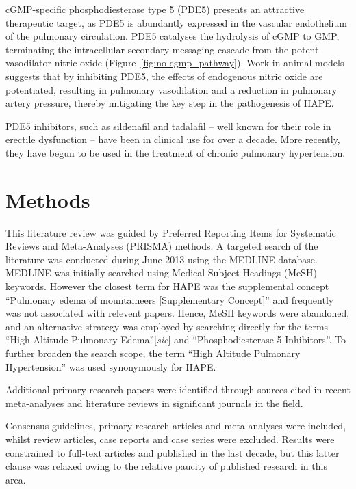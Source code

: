 \documentclass[12pt,a4paper]{article}
\begin{document}
cGMP-specific phosphodiesterase type 5 (PDE5) presents an attractive therapeutic target, as PDE5 is abundantly expressed in the vascular endothelium of the pulmonary circulation.\cite{Ahn:1991vt} PDE5 catalyses the hydrolysis of cGMP to GMP, terminating the intracellular secondary messaging cascade from the potent vasodilator nitric oxide (Figure~\ref{fig:no-cgmp_pathway}).\cite{Archer:2009cx} Work in animal models suggests that by inhibiting PDE5, the effects of endogenous nitric oxide are potentiated, resulting in pulmonary vasodilation and a reduction in pulmonary artery pressure, thereby mitigating the key step in the pathogenesis of HAPE.\cite{Zhao:2001kj}

PDE5 inhibitors, such as sildenafil and tadalafil -- well known for their role in erectile dysfunction -- have been in clinical use for over a decade. More recently, they have begun to be used in the treatment of chronic pulmonary hypertension.\cite{NationalPulmonaryHypertensionCentresoftheUKandIreland:2008jh}

\section*{Methods}

This literature review was guided by Preferred Reporting Items for Systematic Reviews and Meta-Analyses (PRISMA) methods.\cite{Moher:2009ew} A targeted search of the literature was conducted during June 2013 using the MEDLINE database. MEDLINE was initially searched using Medical Subject Headings (MeSH) keywords. However the closest term for HAPE was the supplemental concept ``Pulmonary edema of mountaineers [Supplementary Concept]'' and frequently was not associated with relevent papers. Hence, MeSH keywords were abandoned, and an alternative strategy was employed by searching directly for the terms ``High Altitude Pulmonary Edema''[\emph{sic}] and ``Phosphodiesterase 5 Inhibitors''. To further broaden the search scope, the term ``High Altitude Pulmonary Hypertension'' was used synonymously for HAPE.

Additional primary research papers were identified through sources cited in recent meta-analyses and literature reviews in significant journals in the field.

Consensus guidelines, primary research articles and meta-analyses were included, whilst review articles, case reports and case series were excluded. Results were constrained to full-text articles and published in the last decade, but this latter clause was relaxed owing to the relative paucity of published research in this area.
\end{document}
